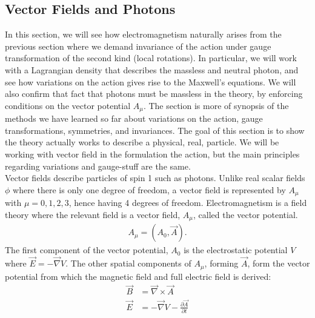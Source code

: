 \documentclass[a4paper,11pt]{article}
\numberwithin{equation}{section}
\theoremstyle{definition}
\begin{document}
\subsection{Vector Fields and Photons}
In this section, we will see how electromagnetism naturally arises from the previous section where we demand invariance of the action under gauge transformation of the second kind (local rotations). In particular, we will work with a Lagrangian density that describes the massless and neutral photon, and see how variations on the action gives rise to the Maxwell's equations. We will also confirm that fact that photons must be massless in the theory, by enforcing conditions on the vector potential $A_\mu$. The section is more of synopsis of the methods we have learned so far about variations on the action, gauge transformations, symmetries, and invariances. The goal of this section is to show the theory actually works to describe a physical, real, particle. We will be working with vector field in the formulation the action, but the main principles regarding variations and gauge-stuff are the same.  \\

Vector fields describe particles of spin 1 such as photons. Unlike real scalar fields $\phi$ where there is only one degree of freedom, a vector field is represented by $A_\mu$ with $\mu = 0,1,2,3$, hence having 4 degrees of freedom. Electromagnetism is a field theory where the relevant field is a vector field, $A_\mu$, called the vector potential.
\begin{align}
A_\mu = (A_0, \vec{A}).
\end{align}
The first component of the vector potential, $A_0$ is the electrostatic potential $V$ where $\vec{E} = -\vec{\nabla}V$. The other spatial components of $A_\mu$, forming $\vec{A}$, form the vector potential from which the magnetic field and full electric field is derived:
\begin{align}
\vec{B} &= \vec{\nabla}\times \vec{A}\\
\vec{E} &= -\vec{\nabla}V - \frac{\partial \vec{A}}{\partial t}
\end{align}
\end{document}
